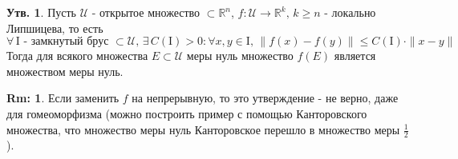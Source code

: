 \documentclass[12pt]{article}
\newcommand{\MR}{\mathbb{R}}
\newcommand{\MI}{\mathrm{I}}
\newcommand{\MU}{\mathcal{U}}
\theoremstyle{definition}
\newtheorem{rem}{Rm:}
\newtheorem{prop}{Утв.}
\begin{document}
\begin{prop}
	Пусть $\MU$ - открытое множество $\subset \MR^n$, $f\colon \MU \to \MR^k, \, k \geq n$ - локально Липшицева, то есть 
	$$
		\forall\,  \MI \text{ - замкнутый брус } \subset \MU, \, \exists \, C(\MI) > 0 \colon \forall x,y \in \MI, \, \|f(x) - f(y)\| \leq C(\MI){\cdot}\|x -y \|
	$$
	Тогда для всякого множества $E \subset \MU$ меры нуль множество $f(E)$ является множеством меры нуль.
\end{prop}

\begin{rem}
	Если заменить $f$ на непрерывную, то это утверждение - не верно, даже для гомеоморфизма (можно построить пример с помощью Канторовского множества, что множество меры нуль Канторовское перешло в множество меры $\tfrac{1}{2}$).
\end{rem}
\end{document}
